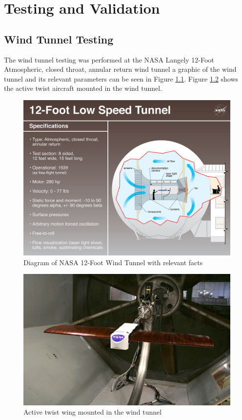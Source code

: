 \documentclass[11pt]{ucthesis}
\begin{document}
\chapter{Testing and Validation}
\section{Wind Tunnel Testing}
The wind tunnel testing was performed at the NASA Langely 12-Foot Atmospheric, closed throat, annular return wind tunnel a graphic of the wind tunnel and its relevant parameters can be seen in Figure \ref{fig:windTunnel}. Figure \ref{fig:flex} shows the active twist aircraft mounted in the wind tunnel.

\begin{figure}[h]
\centering
\includegraphics[width=1\linewidth]{Figures/12FootWindTunnel.png}
\caption{Diagram of NASA 12-Foot Wind Tunnel with relevant facts}
\label{fig:windTunnel}
\end{figure}

\begin{figure}[h]
\centering
\includegraphics[width=1\linewidth]{Figures/wingFlex.png}
\caption{Active twist wing mounted in the wind tunnel}
\label{fig:flex}
\end{figure}
\end{document}
